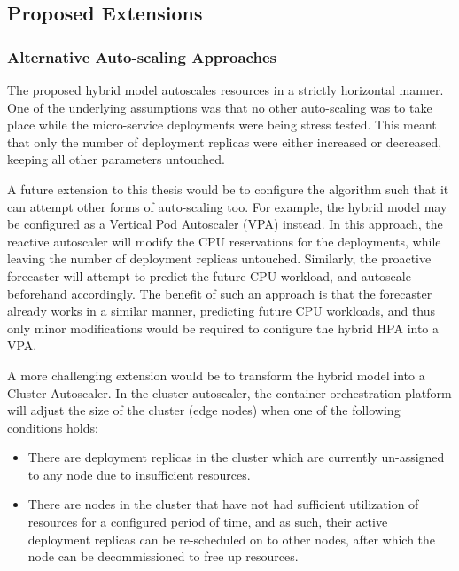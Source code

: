 \subsection{Proposed Extensions}
\label{subsec:ch7-extensions}

\subsubsection{Alternative Auto-scaling Approaches}
\label{subsubsec:ch7-alternate-auto}

The proposed hybrid model autoscales resources in a strictly horizontal manner. One of the underlying assumptions was that no other auto-scaling was to take place while the micro-service deployments were being stress tested. This meant that only the number of deployment replicas were either increased or decreased, keeping all other parameters untouched.\par

A future extension to this thesis would be to configure the algorithm such that it can attempt other forms of auto-scaling too. For example, the hybrid model may be configured as a Vertical Pod Autoscaler (VPA) instead. In this approach, the reactive autoscaler will modify the CPU reservations for the deployments, while leaving the number of deployment replicas untouched. Similarly, the proactive forecaster will attempt to predict the future CPU workload, and autoscale beforehand accordingly. The benefit of such an approach is that the forecaster already works in a similar manner, predicting future CPU workloads, and thus only minor modifications would be required to configure the hybrid HPA into a VPA.\par

A more challenging extension would be to transform the hybrid model into a Cluster Autoscaler. In the cluster autoscaler, the container orchestration platform will adjust the size of the cluster (edge nodes) when one of the following conditions holds:

\begin{itemize}
    \item There are deployment replicas in the cluster which are currently un-assigned to any node due to insufficient resources.
    \item There are nodes in the cluster that have not had sufficient utilization of resources for a configured period of time, and as such, their active deployment replicas can be re-scheduled on to other nodes, after which the node can be decommissioned to free up resources.
\end{itemize}

